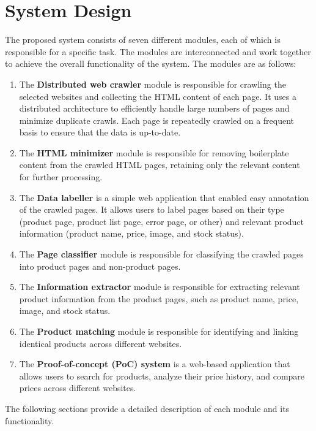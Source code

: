 \chapter{System Design}
\label{chap:system_design}

The proposed system consists of seven different modules, each of which is responsible for a specific task.
The modules are interconnected and work together to achieve the overall functionality of the system. The modules are as follows:
\begin{enumerate}
    \item The \textbf{Distributed web crawler} module is responsible for crawling the selected websites and collecting the HTML content of each page.
    It uses a distributed architecture to efficiently handle large numbers of pages and minimize duplicate crawls.
    Each page is repeatedly crawled on a frequent basis to ensure that the data is up-to-date.

    \item The \textbf{HTML minimizer} module is responsible for removing boilerplate content from the crawled HTML pages, retaining only the relevant content for further processing.

    \item The \textbf{Data labeller} is a simple web application that enabled easy annotation of the crawled pages.
    It allows users to label pages based on their type (product page, product list page, error page, or other) and relevant product information (product name, price, image, and stock status).

    \item The \textbf{Page classifier} module is responsible for classifying the crawled pages into product pages and non-product pages.

    \item The \textbf{Information extractor} module is responsible for extracting relevant product information from the product pages, such as product name, price, image, and stock status.

    \item The \textbf{Product matching} module is responsible for identifying and linking identical products across different websites.

    \item The \textbf{Proof-of-concept (PoC) system} is a web-based application that allows users to search for products, analyze their price history, and compare prices across different websites.

\end{enumerate}

The following sections provide a detailed description of each module and its functionality.









